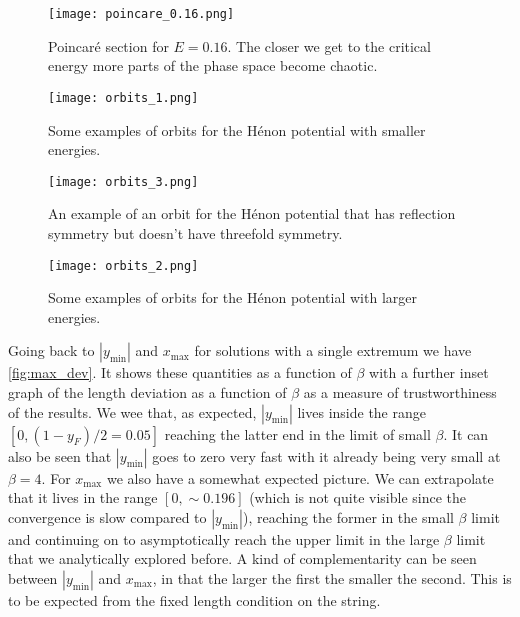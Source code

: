 \documentclass[10pt,a4paper,twocolumn]{article}
\begin{document}
\begin{figure}[h]
    \centering
    \texttt{[image: poincare\_0.16.png]}
    \caption{Poincar\'e section for $E=0.16$. The closer we get to the critical energy more parts of the phase space become chaotic.}
    \label{fig:poincare_2}
\end{figure}

\begin{figure}[h]
    \centering
    \texttt{[image: orbits\_1.png]}
    \caption{Some examples of orbits for the H\'enon potential with smaller energies.}
    \label{fig:orbits_1}
\end{figure}

\begin{figure}[h]
    \centering
    \texttt{[image: orbits\_3.png]}
    \caption{An example of an orbit for the H\'enon potential that has reflection symmetry but doesn't have threefold symmetry.}
    \label{fig:orbits_3}
\end{figure}

\begin{figure}[!b]
    \centering
    \texttt{[image: orbits\_2.png]}
    \caption{Some examples of orbits for the H\'enon potential with larger energies.}
    \label{fig:orbits_2}
\end{figure}

Going back to $|y_{\mathrm{\min}}|$ and $x_{\mathrm{\max}}$ for solutions with a single extremum we have \cref{fig:max_dev}. It shows these quantities as a function of $\beta$ with a further inset graph of the length deviation as a function of $\beta$ as a measure of trustworthiness of the results. We wee that, as expected, $|y_{\mathrm{\min}}|$ lives inside the range $[0, (1 - y_F)/2 = 0.05]$ reaching the latter end in the limit of small $\beta$. It can also be seen that $|y_{\mathrm{\min}}|$ goes to zero very fast with it already being very small at $\beta=4$. For $x_{\mathrm{\max}}$ we also have a somewhat expected picture. We can extrapolate that it lives in the range $[0, \sim \! 0.196]$ (which is not quite visible since the convergence is slow compared to $|y_{\mathrm{\min}}|$), reaching the former in the small $\beta$ limit and continuing on to asymptotically reach the upper limit in the large $\beta$ limit that we analytically explored before. A kind of complementarity can be seen between $|y_{\mathrm{\min}}|$ and $x_{\mathrm{\max}}$, in that the larger the first the smaller the second. This is to be expected from the fixed length condition on the string.
\end{document}
